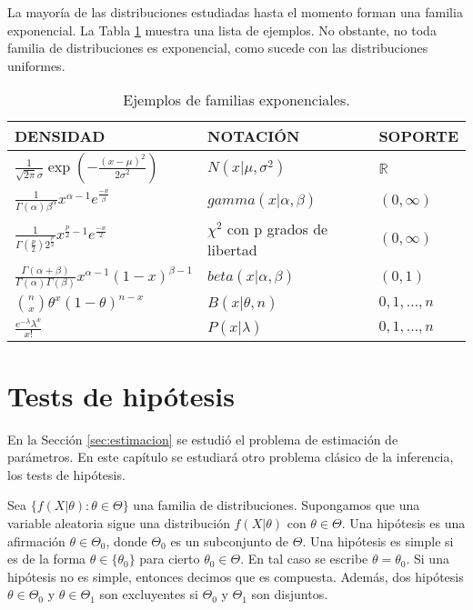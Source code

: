 \documentclass{article}
\begin{document}
    La mayoría de las distribuciones estudiadas hasta el momento forman una familia exponencial. La Tabla \ref{table:exponencial} muestra una lista de ejemplos. No obstante, no toda familia de distribuciones es exponencial, como sucede con las distribuciones uniformes.

    \begin{table}[H]
    	\begin{center}
    		\begin{tabular}{|l|l|l|}
    			\hline
    			DENSIDAD & NOTACIÓN & SOPORTE\\
    			\hline \hline
                $\frac{1}{\sqrt{2 \pi} \sigma} \exp\left(- \frac{(x-\mu)^2}{2\sigma^2}\right)$ & $N(x|\mu, \sigma^2)$ & $\mathbb{R}$ \\
                \hline
                $\frac{1}{\Gamma(\alpha)\beta^\alpha}x^{\alpha - 1}e^{\frac{-x}{\beta}}$ & $ gamma(x|\alpha,\beta)$ &   $(0,\infty)  $\\ \hline
    			$\frac{1}{\Gamma(\frac{p}{2})2^{\frac{p}{2}}}x^{\frac{p}{2} - 1}e^{\frac{-x}{2}}$ & $\chi^2$ con p grados de libertad  & $(0,\infty)  $ \\ \hline
    			$\frac{\Gamma(\alpha + \beta)}{\Gamma(\alpha) \Gamma(\beta)} x ^{\alpha - 1}(1-x)^{\beta - 1}$ &  $beta(x| \alpha, \beta)$   &   $(0,1)$   \\ \hline
    			$\binom{n}{x} \theta ^x (1-\theta)^{n-x}$ &  $B(x|\theta, n)$ & ${0,1, \ldots , n}$   \\ \hline
    			$\frac{e^{-\lambda} \lambda^x}{x!}$ & $P(x|\lambda)$ & ${0,1, \ldots , n}$   \\ \hline
    		\end{tabular}
    	\end{center}
        \caption{Ejemplos de familias exponenciales.}
        \label{table:exponencial}
    \end{table}

\section{Tests de hipótesis}

En la Sección \ref{sec:estimacion} se estudió el problema de estimación de parámetros. En este capítulo se estudiará otro problema clásico de la inferencia, los tests de hipótesis.

\begin{definition}
    Sea $\{f(X|\theta): \theta \in \Theta\}$ una familia de distribuciones. Supongamos que una variable aleatoria sigue una distribución $f(X|\theta)$ con $\theta \in \Theta$. Una hipótesis es una afirmación $\theta \in \Theta_0$, donde $\Theta_0$ es un subconjunto de $\Theta$. Una hipótesis es simple si es de la forma  $\theta \in \{\theta_0\}$ para cierto $\theta_0 \in \Theta$. En tal caso se escribe $\theta = \theta_0$. Si una hipótesis no es simple, entonces decimos que es compuesta. Además, dos hipótesis $\theta \in \Theta_0$ y $\theta \in \Theta_1$ son excluyentes si $\Theta_0$ y $\Theta_1$ son disjuntos.
\end{definition}
\end{document}
